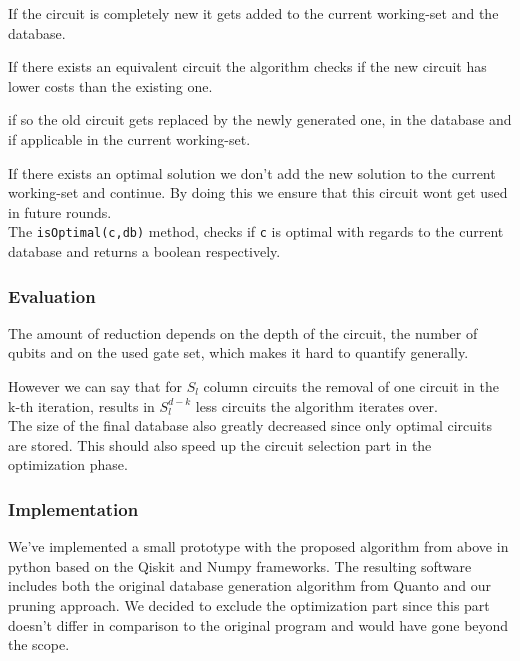 If the circuit is completely new it gets added to the current working-set and the database. 

If there exists an equivalent circuit the algorithm checks if the new circuit has lower costs than the existing one. 

if so the old circuit gets replaced by the newly generated one, in the database and if applicable in the current working-set. 

If there exists an optimal solution we don't add the new solution to the current working-set and continue. By doing this we ensure that this circuit wont get used in future rounds.\\

The \texttt{isOptimal(c,db)} method, checks if \texttt{c} is optimal with regards to the current database  and returns a boolean respectively.\\



\subsubsection{Evaluation}
The amount of reduction depends on the depth of the circuit, the number of qubits and on the used gate set, which makes it hard to quantify generally. 

However we can say that for $S_l$ column circuits the removal of one circuit in the k-th iteration, results in $S_l^{d-k}$ less circuits the algorithm iterates over.\\

The size of the final database also greatly decreased since only optimal circuits are stored. This should also speed up the circuit selection part in the optimization phase.

\subsubsection{Implementation}
We've implemented a small prototype with the proposed algorithm from above in python based on the Qiskit and Numpy frameworks. 
The resulting software includes both the original database generation algorithm from Quanto and our pruning approach. 
We decided to exclude the optimization part since this part doesn't differ in comparison to the original program and would have gone beyond the scope.

